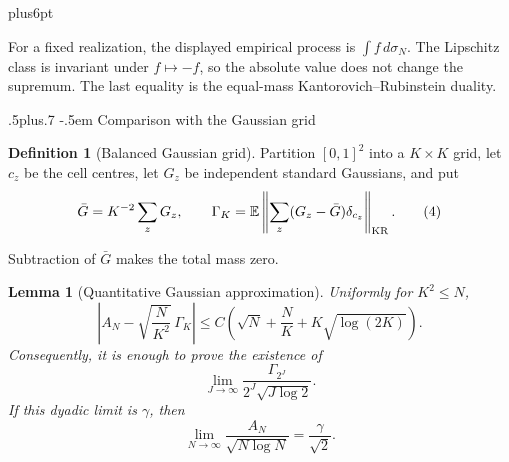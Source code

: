 \documentclass[11pt,reqno]{amsart}
\makeatletter
\def\subsection{\@startsection{subsection}{2}{0pt}%
  {.5\linespacing plus.7\linespacing}
  {-.5em}
  {\normalfont\scshape}}
\theoremstyle{plain}
\newtheorem{lemma}[theorem]{Lemma}
\theoremstyle{definition}
\newtheorem{definition}[theorem]{Definition}
\theoremstyle{remark}
\renewenvironment{proof}[1][\proofname]{%
  \par
  \pushQED{\qed}%
  \normalfont
  \topsep6pt plus6pt\relax
  \trivlist
  \item[\hskip\labelsep\slshape #1\@addpunct{.}]%
  \ignorespaces
}{%
  \popQED
  \endtrivlist
  \@endpefalse
}
\DeclareRobustCommand{\qed}{%
  \leavevmode\unskip\penalty9999\hbox{}\nobreak
  \ifmmode
    \makebox[0pt][l]{\qquad\hbox{\qedsymbol}}%
  \else
    \qquad\hbox{\qedsymbol}%
  \fi
}
\renewcommand{\qedsymbol}{\rule[.47pt]{4pt}{6pt}}
\numberwithin{equation}{section}
\newcommand{\1}{\mathbf 1}
\makeatother
\begin{document}
\begin{proof}
For a fixed realization, the displayed empirical process is
$\int f\,d\sigma_ N$. The Lipschitz class is invariant under $f\mapsto-f$,
so the absolute value does not change the supremum. The last equality is
the equal-mass Kantorovich--Rubinstein duality. 
\end{proof}

\subsection{Comparison with the Gaussian grid}

\begin{definition}[Balanced Gaussian grid]\label{def:gaussian-grid}
Partition $[0,1]^2$ into a $K\times K$ grid, let $c_ z$ be the cell
centres, let $G_ z$ be independent standard Gaussians, and put
\begin{equation}
\bar G=K^{-2}\sum_ zG_ z,\qquad
\Gamma_ K=\mathbb E\left\|
\sum_ z(G_ z-\bar G)\delta_ {c_ z}\right\|_ {\rm KR}.
\tag{4}
\end{equation}

Subtraction of $\bar G$ makes the total mass zero.

\end{definition}

\begin{lemma}[Quantitative Gaussian approximation]\label{lem:gaussianization-dyadic}
Uniformly for $K^2\leq N$,
\begin{equation}
\left|A_ N-\sqrt{\frac N{K^2}}\,\Gamma_ K\right|
\leq C\left(\sqrt N+\frac NK+K\sqrt{\log(2K)}\right).
\tag{5}
\end{equation}
Consequently, it is enough to prove the existence of
\begin{equation}
\lim_ {J\to\infty}
\frac{\Gamma_ {2^J}}{2^J\sqrt{J\log2}}.
\tag{6}
\end{equation}
If this dyadic limit is $\gamma$, then
\begin{equation}
\lim_ {N\to\infty}\frac{A_ N}{\sqrt{N\log N}}
=\frac\gamma{\sqrt2}.
\tag{7}
\end{equation}

\end{lemma}
\end{document}
